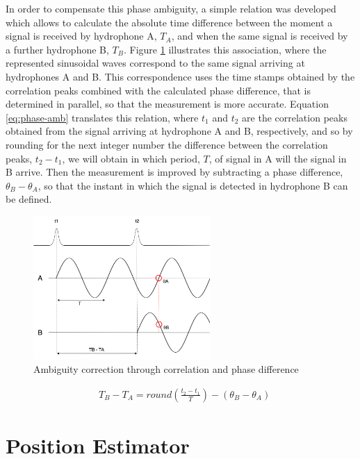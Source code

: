 In order to compensate this phase ambiguity, a simple relation was developed which allows to calculate the absolute time difference between the moment a signal is received by hydrophone A, $T_A$, and when the same signal is received by a further hydrophone B, $T_B$. Figure \ref{fig:ambiguity} illustrates this association, where the represented sinusoidal waves correspond to the same signal arriving at hydrophones A and B. This correspondence uses the time stamps obtained by the correlation peaks combined with the calculated phase difference, that is determined in parallel, so that the measurement is more accurate. Equation \ref{eq:phase-amb} translates this relation, where $t_1$ and $t_2$ are the correlation peaks obtained from the signal arriving at hydrophone A and B, respectively, and so by rounding for the next integer number the difference between the correlation peaks, $t_2 - t_1$, we will obtain in which period, $T$, of signal in A will the signal in B arrive. Then the measurement is improved by subtracting a phase difference, $\theta_B - \theta_A$, so that the instant in which the signal is detected in hydrophone B can be defined. 

\begin{figure}[!htbp]
	\centering
	\includegraphics[width=0.6\textwidth]{figures/ambiguity}
	\captionsetup{justification=centering,margin=2cm}
	\caption{Ambiguity correction through correlation and phase difference}
	\label{fig:ambiguity}
\end{figure}

\begin{eqnarray}
& T_B - T_A = round(\frac{t_2-t_1}{T}) - (\theta_B - \theta_A)
\label{eq:phase-amb}
\end{eqnarray}


\section{Position Estimator} \label{subsec:AoA}

